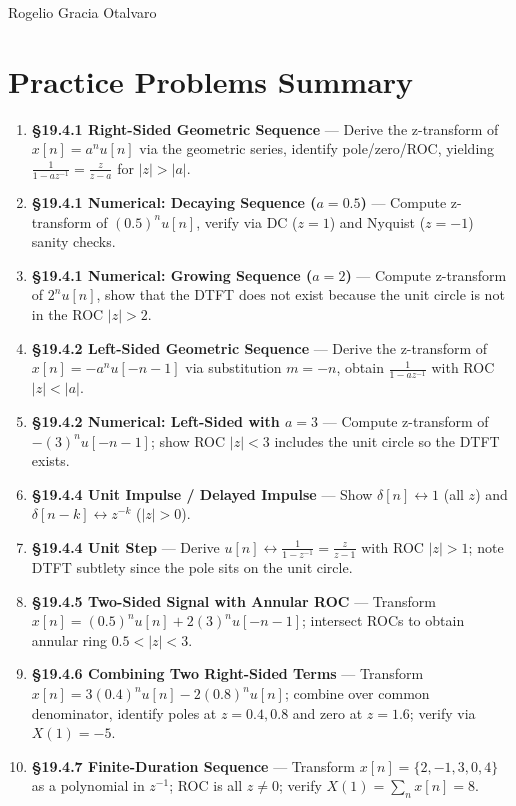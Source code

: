 \documentclass[11pt]{article}
\begin{document}
Rogelio Gracia Otalvaro

\section*{Practice Problems Summary}

\begin{enumerate}
  \item \textbf{\S19.4.1 Right-Sided Geometric Sequence} — Derive the z-transform of $x[n] = a^n u[n]$ via the geometric series, identify pole/zero/ROC, yielding $\frac{1}{1 - az^{-1}} = \frac{z}{z-a}$ for $|z| > |a|$.
  \item \textbf{\S19.4.1 Numerical: Decaying Sequence ($a = 0.5$)} — Compute z-transform of $(0.5)^n u[n]$, verify via DC ($z=1$) and Nyquist ($z=-1$) sanity checks.
  \item \textbf{\S19.4.1 Numerical: Growing Sequence ($a = 2$)} — Compute z-transform of $2^n u[n]$, show that the DTFT does not exist because the unit circle is not in the ROC $|z| > 2$.
  \item \textbf{\S19.4.2 Left-Sided Geometric Sequence} — Derive the z-transform of $x[n] = -a^n u[-n-1]$ via substitution $m = -n$, obtain $\frac{1}{1 - az^{-1}}$ with ROC $|z| < |a|$.
  \item \textbf{\S19.4.2 Numerical: Left-Sided with $a = 3$} — Compute z-transform of $-(3)^n u[-n-1]$; show ROC $|z| < 3$ includes the unit circle so the DTFT exists.
  \item \textbf{\S19.4.4 Unit Impulse / Delayed Impulse} — Show $\delta[n] \leftrightarrow 1$ (all $z$) and $\delta[n-k] \leftrightarrow z^{-k}$ ($|z|>0$).
  \item \textbf{\S19.4.4 Unit Step} — Derive $u[n] \leftrightarrow \frac{1}{1 - z^{-1}} = \frac{z}{z-1}$ with ROC $|z| > 1$; note DTFT subtlety since the pole sits on the unit circle.
  \item \textbf{\S19.4.5 Two-Sided Signal with Annular ROC} — Transform $x[n] = (0.5)^n u[n] + 2(3)^n u[-n-1]$; intersect ROCs to obtain annular ring $0.5 < |z| < 3$.
  \item \textbf{\S19.4.6 Combining Two Right-Sided Terms} — Transform $x[n] = 3(0.4)^n u[n] - 2(0.8)^n u[n]$; combine over common denominator, identify poles at $z = 0.4, 0.8$ and zero at $z = 1.6$; verify via $X(1) = -5$.
  \item \textbf{\S19.4.7 Finite-Duration Sequence} — Transform $x[n] = \{2, -1, 3, 0, 4\}$ as a polynomial in $z^{-1}$; ROC is all $z \neq 0$; verify $X(1) = \sum_n x[n] = 8$.
\end{enumerate}
\end{document}
